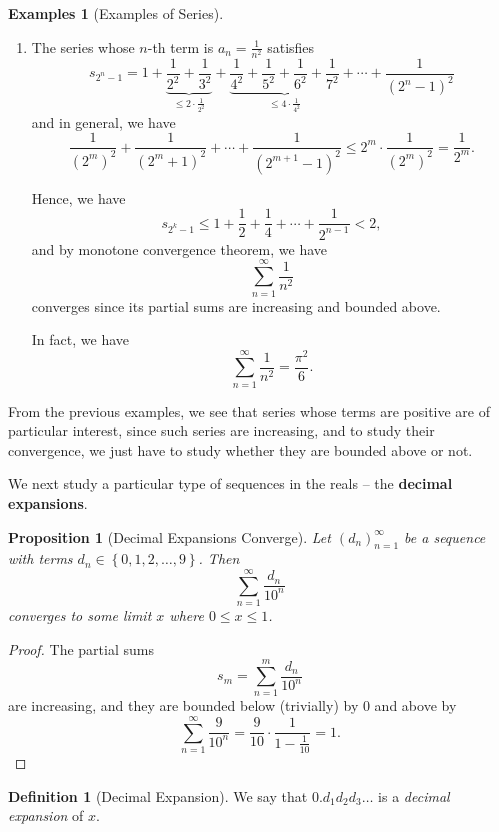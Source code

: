 \documentclass{article}
\newtheorem{proposition}[theorem]{Proposition}
\theoremstyle{definition}
\newtheorem{definition}[theorem]{Definition}
\newtheorem{examples}[theorem]{Examples}
\theoremstyle{remark}
\newcommand{\pqty}[1]{\left(#1\right)}
\newcommand{\Bqty}[1]{\left\{#1\right\}}
\begin{document}
\begin{examples}[Examples of Series]
\begin{enumerate}
        \item The series whose \(n\)-th term is \(a_n = \frac{1}{n^2}\) satisfies
        \[
            s_{2^n - 1} = 1 + \underbrace{\frac{1}{2^2} + \frac{1}{3^2}}_{\leq 2 \cdot \frac{1}{2^2}} + \underbrace{\frac{1}{4^2} + \frac{1}{5^2} + \frac{1}{6^2} + \frac{1}{7^2}}_{\leq 4 \cdot \frac{1}{4^2}} + \cdots + \frac{1}{\pqty{2^n - 1}^2}
        \]
        and in general, we have
        \[
            \frac{1}{\pqty{2^m}^2} + \frac{1}{\pqty{2^m + 1}^2} + \cdots + \frac{1}{\pqty{2^{m + 1} - 1}^2} \leq 2^m \cdot \frac{1}{\pqty{2^m}^2} = \frac{1}{2^m}.
        \]

        Hence, we have
        \[
            s_{2^k - 1} \leq 1 + \frac{1}{2} + \frac{1}{4} + \cdots + \frac{1}{2^{n - 1}} < 2,
        \]
        and by monotone convergence theorem, we have
        \[
            \sum_{n = 1}^{\infty} \frac{1}{n^2}
        \]
        converges since its partial sums are increasing and bounded above.

        In fact, we have
        \[
            \sum_{n = 1}^{\infty} \frac{1}{n^2} = \frac{\pi^2}{6}.
        \]
    \end{enumerate}
\end{examples}

From the previous examples, we see that series whose terms are positive are of particular interest, since such series are increasing, and to study their convergence, we just have to study whether they are bounded above or not.

We next study a particular type of sequences in the reals -- the \textbf{decimal expansions}.

\begin{proposition}[Decimal Expansions Converge]
    Let \(\pqty{d_n}_{n = 1}^{\infty}\) be a sequence with terms \(d_n \in \Bqty{0, 1, 2, \ldots, 9}\). Then
    \[
        \sum_{n = 1}^{\infty} \frac{d_n}{10^n}
    \]
    converges to some limit \(x\) where \(0 \leq x \leq 1\).
\end{proposition}

\begin{proof}
    The partial sums
    \[
        s_m = \sum_{n = 1}^{m} \frac{d_n}{10^n}
    \]
    are increasing, and they are bounded below (trivially) by \(0\) and above by
    \[
        \sum_{n = 1}^{\infty} \frac{9}{10^n} = \frac{9}{10} \cdot \frac{1}{1 - \frac{1}{10}} = 1.
    \]
\end{proof}

\begin{definition}[Decimal Expansion]
    We say that \(0.d_1 d_2 d_3 \ldots\) is a \emph{decimal expansion} of \(x\).
\end{definition}
\end{document}
